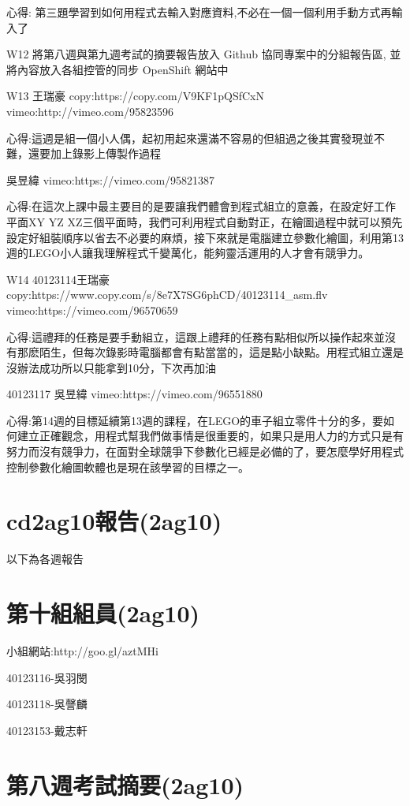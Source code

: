 \documentclass[]{article}
\begin{document}
心得:
第三題學習到如何用程式去輸入對應資料,不必在一個一個利用手動方式再輸入了

W12 將第八週與第九週考試的摘要報告放入 Github 協同專案中的分組報告區,
並將內容放入各組控管的同步 OpenShift 網站中

W13 王瑞豪 copy:https://copy.com/V9KF1pQSfCxN
vimeo:http://vimeo.com/95823596

心得:這週是組一個小人偶，起初用起來還滿不容易的但組過之後其實發現並不難，還要加上錄影上傳製作過程

吳昱緯 vimeo:https://vimeo.com/95821387

心得:在這次上課中最主要目的是要讓我們體會到程式組立的意義，在設定好工作平面XY
YZ
XZ三個平面時，我們可利用程式自動對正，在繪圖過程中就可以預先設定好組裝順序以省去不必要的麻煩，接下來就是電腦建立參數化繪圖，利用第13週的LEGO小人讓我理解程式千變萬化，能夠靈活運用的人才會有競爭力。

W14 40123114王瑞豪
copy:https://www.copy.com/s/8e7X7SG6phCD/40123114\_asm.flv
vimeo:https://vimeo.com/96570659

心得:這禮拜的任務是要手動組立，這跟上禮拜的任務有點相似所以操作起來並沒有那麽陌生，但每次錄影時電腦都會有點當當的，這是點小缺點。用程式組立還是沒辦法成功所以只能拿到10分，下次再加油

40123117 吳昱緯 vimeo:https://vimeo.com/96551880

心得:第14週的目標延續第13週的課程，在LEGO的車子組立零件十分的多，要如何建立正確觀念，用程式幫我們做事情是很重要的，如果只是用人力的方式只是有努力而沒有競爭力，在面對全球競爭下參數化已經是必備的了，要怎麼學好用程式控制參數化繪圖軟體也是現在該學習的目標之一。

\section{cd2ag10報告(2ag10)}\label{cd2ag10ux5831ux544a2ag10}

以下為各週報告

\section{第十組組員(2ag10)}\label{ux7b2cux5341ux7d44ux7d44ux54e12ag10}

小組網站:http://goo.gl/aztMHi

40123116-吳羽閔

40123118-吳謦麟

40123153-戴志軒

\section{第八週考試摘要(2ag10)}\label{ux7b2cux516bux9031ux8003ux8a66ux6458ux89812ag10}
\end{document}
